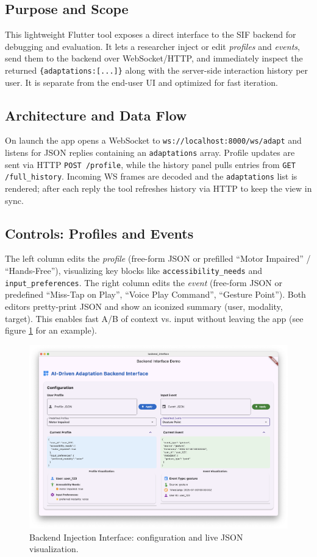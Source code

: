\documentclass[openany]{book}
\begin{document}
\subsection{Purpose and Scope}
This lightweight Flutter tool exposes a direct interface to the SIF backend for debugging and evaluation. It lets a researcher inject or edit \emph{profiles} and \emph{events}, send them to the backend over WebSocket/HTTP, and immediately inspect the returned \texttt{\{adaptations:[...]\}} along with the server-side interaction history per user. It is separate from the end-user UI and optimized for fast iteration. 

\subsection{Architecture and Data Flow}
On launch the app opens a WebSocket to \texttt{ws://localhost:8000/ws/adapt} and listens for JSON replies containing an \texttt{adaptations} array. Profile updates are sent via HTTP \texttt{POST /profile}, while the history panel pulls entries from \texttt{GET /full\_history}. Incoming WS frames are decoded and the \texttt{adaptations} list is rendered; after each reply the tool refreshes history via HTTP to keep the view in sync. 

\subsection{Controls: Profiles and Events}
The left column edits the \emph{profile} (free-form JSON or prefilled “Motor Impaired” / “Hands-Free”), visualizing key blocks like \texttt{accessibility\_needs} and \texttt{input\_preferences}. The right column edits the \emph{event} (free-form JSON or predefined “Miss-Tap on Play”, “Voice Play Command”, “Gesture Point”). Both editors pretty-print JSON and show an iconized summary (user, modality, target). This enables fast A/B of context vs. input without leaving the app (see figure \ref{fig:backend-inject-adapt-config} for an example).

\begin{figure}[h]
\centering
\includegraphics[width=.5\linewidth]{images/fig_backend_inject_config.png}\hfill
\caption{Backend Injection Interface: configuration and live JSON visualization.}
\label{fig:backend-inject-adapt-config}
\end{figure}
\end{document}
